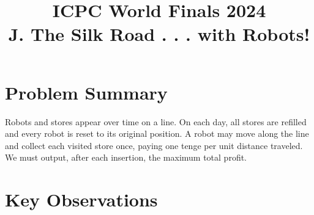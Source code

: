 \documentclass[11pt]{article}
\title{ICPC World Finals 2024\\J. The Silk Road . . . with Robots!}
\author{}
\date{}
\begin{document}
\maketitle

\section*{Problem Summary}

Robots and stores appear over time on a line. On each day, all stores are refilled and every robot is reset to its original position. A robot may move along the line and collect each visited store once, paying one tenge per unit distance traveled. We must output, after each insertion, the maximum total profit.

\section*{Key Observations}
\end{document}
